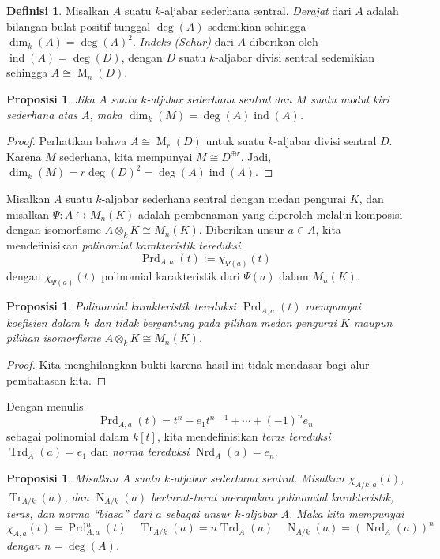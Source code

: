 \documentclass[12pt]{article}
\theoremstyle{plain}
\newtheorem{proposition}[theorem]{Proposisi}
\theoremstyle{definition}
\newtheorem{definition}[theorem]{Definisi}
\theoremstyle{remark}
\numberwithin{equation}{section}
\begin{document}
\begin{definition}
Misalkan $A$ suatu $k$-aljabar sederhana sentral.
\emph{Derajat} dari $A$ adalah bilangan bulat positif tunggal
$\deg(A)$ sedemikian sehingga
$\dim_k(A)=\deg(A)^2$.
\emph{Indeks (Schur)} dari $A$ diberikan oleh $\operatorname{ind}(A)=\deg(D)$,
dengan $D$ suatu $k$-aljabar divisi sentral sedemikian sehingga
$A\cong \operatorname{M}_n(D)$.
\end{definition}

\begin{proposition}
Jika $A$ suatu $k$-aljabar sederhana sentral dan
$M$ suatu modul kiri sederhana atas $A$, maka
$\dim_k(M) =\deg(A) \operatorname{ind}(A)$.
\end{proposition}

\begin{proof}
Perhatikan bahwa $A \cong \operatorname{M}_r(D)$ untuk suatu $k$-aljabar divisi
sentral $D$.
Karena $M$ sederhana, kita mempunyai $M \cong D^{\oplus r}$.
Jadi, $\dim_k(M) = r \deg(D)^2=\deg(A) \operatorname{ind}(A)$.
\end{proof}

Misalkan $A$ suatu $k$-aljabar sederhana sentral dengan medan pengurai $K$,
dan misalkan $\Psi : A \hookrightarrow M_n(K)$ adalah pembenaman
yang diperoleh melalui komposisi dengan isomorfisme $A \otimes_k K \cong
M_n(K)$.
Diberikan unsur $a \in A$, kita mendefinisikan
\emph{polinomial karakteristik tereduksi}
\[
\operatorname{Prd}_{A,a}(t) := \chi_{\Psi(a)}(t)
\]
dengan $\chi_{\Psi(a)}(t)$ polinomial karakteristik
dari $\Psi(a)$ dalam $M_n(K)$.

\begin{proposition}
Polinomial karakteristik tereduksi
$\operatorname{Prd}_{A,a}(t)$ mempunyai koefisien dalam $k$ dan tidak bergantung pada
pilihan medan pengurai $K$ maupun pilihan isomorfisme
$A \otimes_k K \cong M_n(K)$.
\end{proposition}

\begin{proof}
Kita menghilangkan bukti karena hasil ini tidak mendasar bagi alur pembahasan kita.
\end{proof}

Dengan menulis
\[
\operatorname{Prd}_{A,a}(t) = t^n - e_1t^{n-1} + \cdots + (-1)^n e_n
\]
sebagai polinomial dalam $k[t]$, kita mendefinisikan
\emph{teras tereduksi} $\operatorname{Trd}_A(a)=e_1$
dan \emph{norma tereduksi} $\operatorname{Nrd}_A(a)=e_n$.

\begin{proposition}
Misalkan $A$ suatu $k$-aljabar sederhana sentral.
Misalkan $\chi_{A/k,a}(t)$, $\operatorname{Tr}_{A/k}(a)$, dan
$\operatorname{N}_{A/k}(a)$
berturut-turut merupakan polinomial karakteristik, teras, dan norma “biasa”
dari $a$ sebagai unsur $k$-aljabar $A$.
Maka kita mempunyai
\[
\chi_{A,a}(t)=\operatorname{Prd}_{A,a}^n(t) \quad
\operatorname{Tr}_{A/k}(a)=n\operatorname{Trd}_A(a) \quad
\operatorname{N}_{A/k}(a)=\left(\operatorname{Nrd}_A(a)\right)^n
\]
dengan $n=\deg(A)$.
\end{proposition}
\end{document}
